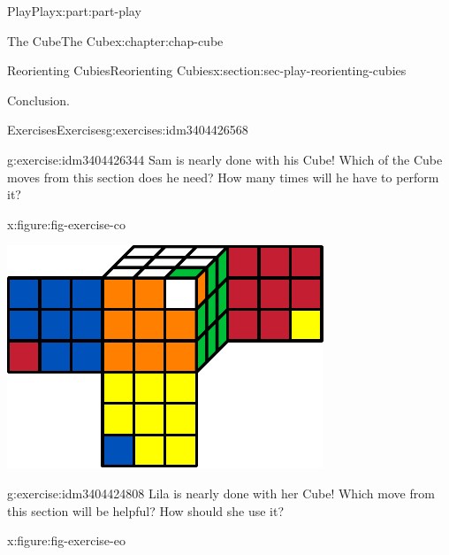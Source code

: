 \documentclass[oneside,10pt,]{book}
\numberwithin{equation}{section}
\begin{document}
\begin{partptx}{Play}{}{Play}{}{}{x:part:part-play}
\begin{chapterptx}{The Cube}{}{The Cube}{}{}{x:chapter:chap-cube}
\begin{sectionptx}{Reorienting Cubies}{}{Reorienting Cubies}{}{}{x:section:sec-play-reorienting-cubies}
\begin{conclusion}{Conclusion.}
\begin{itemize}[label=\textbullet]
\end{itemize}
%
\end{conclusion}%
%
%
\typeout{************************************************}
\typeout{************************************************}
%
\begin{exercises-subsection-numberless}{Exercises}{}{Exercises}{}{}{g:exercises:idm3404426568}
\begin{divisionexercise}{1}{}{}{g:exercise:idm3404426344}%
Sam is nearly done with his Cube! Which of the Cube moves from this section does he need? How many times will he have to perform it?%
\begin{figureptx}{}{x:figure:fig-exercise-co}{}%
\begin{image}{0.25}{0.5}{0.25}%
\includegraphics[width=\linewidth]{./images/co.pdf}
\end{image}%
\tcblower
\end{figureptx}%
\end{divisionexercise}%
\begin{divisionexercise}{2}{}{}{g:exercise:idm3404424808}%
Lila is nearly done with her Cube! Which move from this section will be helpful? How should she use it?%
\begin{figureptx}{}{x:figure:fig-exercise-eo}{}%
\begin{image}{0.25}{0.5}{0.25}%

\end{image}
\end{figureptx}
\end{divisionexercise}
\end{exercises-subsection-numberless}
\end{sectionptx}
\end{chapterptx}
\end{partptx}
\end{document}
